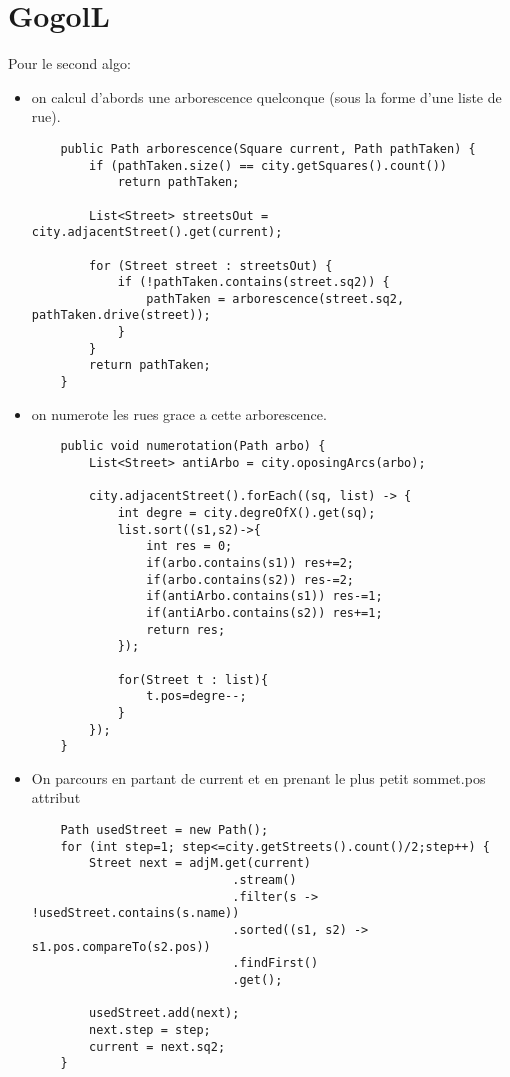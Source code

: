 \documentclass[a4paper, 11pt]{article}
\begin{document}
\section*{GogolL}
Pour le second algo: 

\begin{itemize}
\item on calcul d'abords une arborescence quelconque (sous la forme d'une
liste de rue).
\begin{verbatim}
    public Path arborescence(Square current, Path pathTaken) {
        if (pathTaken.size() == city.getSquares().count())
            return pathTaken;

        List<Street> streetsOut = city.adjacentStreet().get(current);

        for (Street street : streetsOut) {
            if (!pathTaken.contains(street.sq2)) {
                pathTaken = arborescence(street.sq2, pathTaken.drive(street));
            }
        }
        return pathTaken;
    }
\end{verbatim}

\item on numerote les rues grace a cette arborescence.
\begin{verbatim}
    public void numerotation(Path arbo) {
        List<Street> antiArbo = city.oposingArcs(arbo);
       
        city.adjacentStreet().forEach((sq, list) -> {
            int degre = city.degreOfX().get(sq);
            list.sort((s1,s2)->{
                int res = 0;
                if(arbo.contains(s1)) res+=2;
                if(arbo.contains(s2)) res-=2;
                if(antiArbo.contains(s1)) res-=1;
                if(antiArbo.contains(s2)) res+=1;
                return res;
            });
            
            for(Street t : list){
                t.pos=degre--;
            }
        });
    }
\end{verbatim}

\item On parcours en partant de current et en prenant le plus petit sommet.pos
attribut
\begin{verbatim}
    Path usedStreet = new Path();
    for (int step=1; step<=city.getStreets().count()/2;step++) {
        Street next = adjM.get(current)
                            .stream()
                            .filter(s -> !usedStreet.contains(s.name))
                            .sorted((s1, s2) -> s1.pos.compareTo(s2.pos))
                            .findFirst()
                            .get();
			
        usedStreet.add(next);
        next.step = step;
        current = next.sq2;
    }
\end{verbatim}
\end{itemize}
\end{document}
